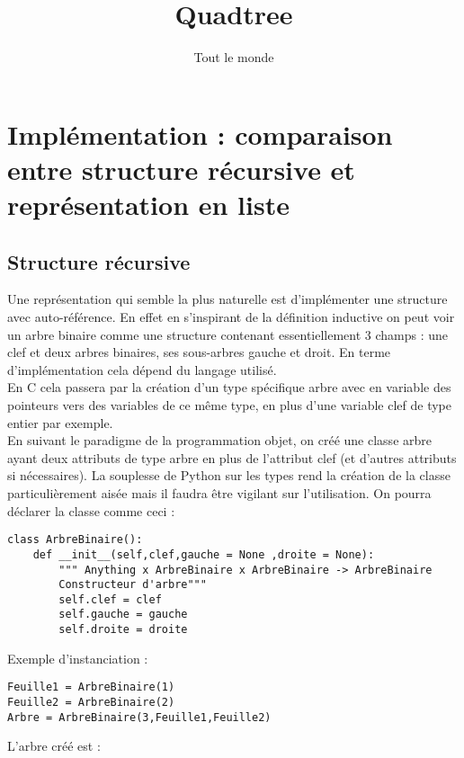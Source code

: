 \documentclass{article}
\title{Quadtree}
\author{Tout le monde}
\begin{document}
\maketitle

\newpage

\tableofcontents

\section{Implémentation : comparaison entre structure récursive et représentation en liste}
\subsection{Structure récursive}
Une représentation qui semble la plus naturelle est d'implémenter une structure avec auto-référence. En effet en s'inspirant de la définition inductive on peut voir un arbre binaire comme une structure contenant essentiellement 3 champs : une clef et deux arbres binaires, ses sous-arbres gauche et droit. 
En terme d'implémentation cela dépend du langage utilisé. \\
 En C cela passera par la création d'un type spécifique arbre avec en variable des pointeurs vers des variables de ce même type, en plus d'une variable clef de type entier par exemple. \\
En suivant le paradigme de la programmation objet, on créé une classe arbre ayant deux attributs de type arbre en plus de l'attribut clef (et d'autres attributs si nécessaires). La souplesse de Python sur les types rend la création de la classe particulièrement aisée mais il faudra être vigilant sur l'utilisation. 
On pourra déclarer la classe comme ceci :

\begin{lstlisting}
class ArbreBinaire():
    def __init__(self,clef,gauche = None ,droite = None):
        """ Anything x ArbreBinaire x ArbreBinaire -> ArbreBinaire
        Constructeur d'arbre"""
        self.clef = clef
        self.gauche = gauche
        self.droite = droite
\end{lstlisting}

Exemple d'instanciation :

\begin{lstlisting}
Feuille1 = ArbreBinaire(1)
Feuille2 = ArbreBinaire(2)
Arbre = ArbreBinaire(3,Feuille1,Feuille2)
\end{lstlisting}

L'arbre créé est :
\begin{center}
\end{center}
\end{document}
